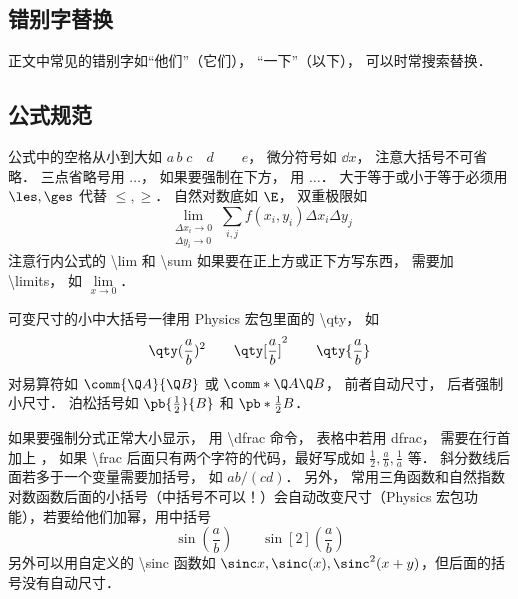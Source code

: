 \subsection{错别字替换}
正文中常见的错别字如“他们”（它们）， “一下”（以下）， 可以时常搜索替换．

\subsection{公式规范}
公式中的空格从小到大如 $a\, b\; c\quad d\qquad e$， 微分符号如 $\dd{x}$， 注意大括号不可省略． 三点省略号用 $\dots$， 如果要强制在下方， 用 $\ldots$． 大于等于或小于等于必须用 $\les, \ges$ 代替 $\le, \ge$． 自然对数底如 $\E$， 双重极限如
\begin{equation}
\lim_{\substack{\Delta x_i\to 0\\ \Delta y_i\to 0}} \sum_{i, j} f(x_i,y_i) \Delta x_i \Delta y_j
\end{equation}
注意行内公式的 \textbackslash lim 和 \textbackslash sum 如果要在正上方或正下方写东西， 需要加 \textbackslash limits， 如 $\lim\limits_{x\to 0}$．

可变尺寸的小中大括号一律用 Physics 宏包里面的 \textbackslash qty， 如
\begin{equation}
\qty(\frac ab)^2 \qquad \qty[\frac ab]^2 \qquad \qty{ \frac ab}
\end{equation}
对易算符如 $\comm{\Q A}{\Q B}$ 或 $\comm*{\Q A}{\Q B}$， 前者自动尺寸， 后者强制小尺寸． 泊松括号如 $\pb{\frac12}{B}$ 和 $\pb*{\frac12}{B}$．

如果要强制分式正常大小显示， 用 \textbackslash dfrac 命令， 表格中若用 dfrac， 需要在行首加上 \dfracH， 如果 \textbackslash frac 后面只有两个字符的代码，最好写成如 $\frac12, \frac ab, \frac1a$ 等． 斜分数线后面若多于一个变量需要加括号， 如 $ab/(cd)$． 另外， 常用三角函数和自然指数对数函数后面的小括号（中括号不可以！）会自动改变尺寸（Physics 宏包功能），若要给他们加幂，用中括号
\begin{equation}
\sin(\frac ab) \qquad \sin[2](\frac ab)
\end{equation}
另外可以用自定义的 \textbackslash sinc 函数如 $\sinc x, \sinc(x), \sinc^2(x+y)$，但后面的括号没有自动尺寸．

